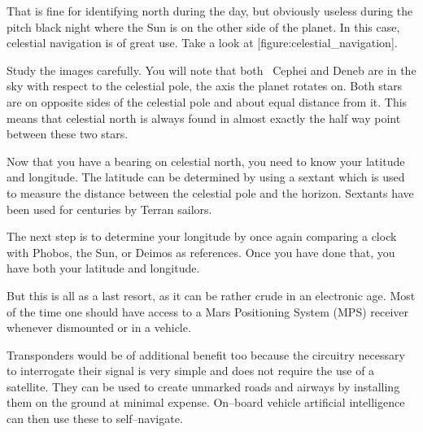 That is fine for identifying north during the day, but obviously useless during the pitch black night where the Sun is on the other side of the planet. In this case, celestial navigation is of great use. Take a look at [figure:celestial_navigation].

    {}
    {}
    {}
    \stopcombination

Study the images carefully. You will note that both \alpha\ Cephei and Deneb are  in the sky with respect to the celestial pole, the axis the planet rotates on. Both stars are on opposite sides of the celestial pole and about equal distance from it. This means that celestial north is always found in almost exactly the half way point between these two stars.

Now that you have a bearing on celestial north, you need to know your latitude and longitude. The latitude can be determined by using a sextant which is used to measure the distance between the celestial pole and the horizon. Sextants have been used for centuries by Terran sailors. 

The next step is to determine your longitude by once again comparing a clock with Phobos, the Sun, or Deimos as references. Once you have done that, you have both your latitude and longitude.

But this is all as a last resort, as it can be rather crude in an electronic age. Most of the time one should have access to a Mars Positioning System (MPS) receiver whenever dismounted or in a vehicle. 

Transponders would be of additional benefit too because the circuitry necessary to interrogate their signal is very simple and does not require the use of a satellite. They can be used to create unmarked roads and airways by installing them on the ground at minimal expense. On--board vehicle artificial intelligence can then use these to self--navigate.

